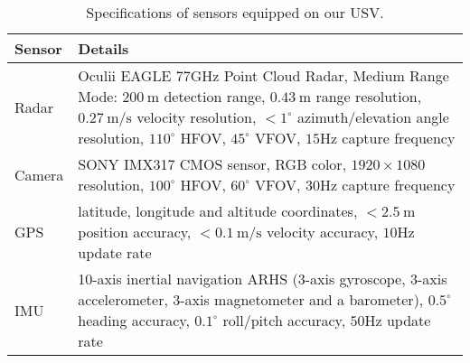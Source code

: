 \documentclass[lettersize,journal]{IEEEtran}
\begin{document}
\begin{table}[hbt]
\caption{Specifications of sensors equipped on our USV.}
\footnotesize
\begin{tabular*}{\linewidth}{p{0.8cm}  p{7.2cm}}
\toprule
\bf{Sensor} & \bf{Details} \\\midrule
Radar & Oculii EAGLE $77\text{GHz}$ Point Cloud Radar, Medium Range Mode: $200\mathrm{~m}$ detection range, $0.43\mathrm{~m}$ range resolution, $0.27\mathrm{~m}$/$\mathrm{s}$ velocity resolution, $<1^\circ$ azimuth/elevation angle resolution, $110^\circ$ HFOV, $45^\circ$ VFOV, $15\text{Hz}$ capture frequency\\
\vspace{-1mm} Camera & \vspace{-1mm} SONY IMX317 CMOS sensor, RGB color, $1920 \times 1080$ resolution, $100^\circ$ HFOV, $60^\circ$ VFOV, $30\text{Hz}$ capture frequency\\
\vspace{-1mm} GPS & \vspace{-1mm} latitude, longitude and altitude coordinates, $<2.5\mathrm{~m}$ position accuracy, $<0.1\mathrm{~m}$/$\mathrm{s}$ velocity accuracy, $10\text{Hz}$ update rate\\
\vspace{-1mm} IMU & \vspace{-1mm} 10-axis inertial navigation ARHS (3-axis gyroscope, 3-axis accelerometer, 3-axis magnetometer and a barometer), $0.5^\circ$ heading accuracy, $0.1^\circ$ roll/pitch accuracy, $50\text{Hz}$ update rate\\
\bottomrule
\end{tabular*}

\label{tab:sensors}
\end{table}
\end{document}

